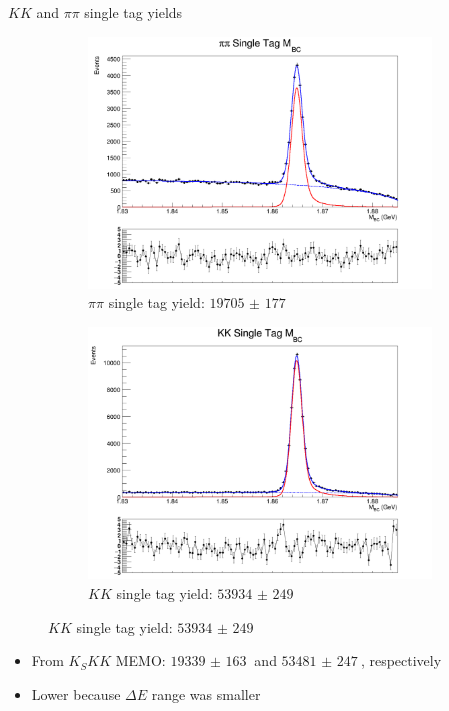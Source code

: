 \documentclass{beamer}
\begin{document}
\begin{frame}{$KK$ and $\pi\pi$ single tag yields}
  \begin{figure}
    \centering
    \begin{subfigure}{0.5\textwidth}
      \centering
      \includegraphics[width=\textwidth]{pipiSingleTagMBCPlot.png}
      \caption{$\pi\pi$ single tag yield: $\SI{19705(177)}{}$}
    \end{subfigure}%
    \begin{subfigure}{0.5\textwidth}
      \centering
      \includegraphics[width=\textwidth]{KKSingleTagMBCPlot.png}
      \caption{$KK$ single tag yield: $\SI{53934(249)}{}$}
    \end{subfigure}
  \end{figure}
  \begin{itemize}
    \item{From $K_SKK$ MEMO: $\SI{19339(163)}{}$ and $\SI{53481(247)}{}$, respectively}
    \item{Lower because $\Delta E$ range was smaller}
  \end{itemize}
\end{frame}
\end{document}
